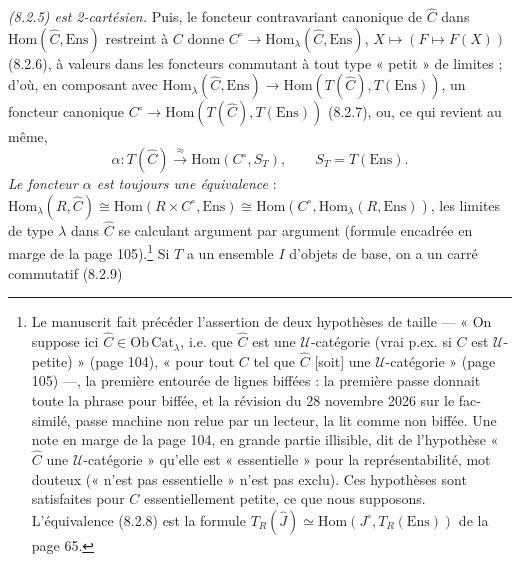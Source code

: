\documentclass[11pt,a4paper]{article}
\begin{document}
\emph{(8.2.5) est 2-cartésien.} Puis, le foncteur contravariant canonique de
$\widehat{C}$ dans $\mathrm{Hom}(\widehat{C}, \mathrm{Ens})$ restreint à $C$
donne $C^{\circ} \to \mathrm{Hom}_{\lambda}(\widehat{C}, \mathrm{Ens})$, $X
\mapsto (F \mapsto F(X))$ (8.2.6), à valeurs dans les foncteurs commutant à
tout type « petit » de limites ; d'où, en composant avec $\mathrm{Hom}_{
\lambda}(\widehat{C}, \mathrm{Ens}) \to \mathrm{Hom}(T(\widehat{C}),
T(\mathrm{Ens}))$, un foncteur canonique $C^{\circ} \to \mathrm{Hom}(T(\widehat{C}),
T(\mathrm{Ens}))$ (8.2.7), ou, ce qui revient au même,
\begin{equation}
\alpha : T(\widehat{C}) \xrightarrow{\ \approx\ } \mathrm{Hom}(C^{\circ}, S_{T}),
\qquad S_{T} = T(\mathrm{Ens}). \tag{8.2.8}
\end{equation}
\emph{Le foncteur $\alpha$ est toujours une équivalence} : $\mathrm{Hom}_{
\lambda}(R, \widehat{C}) \cong \mathrm{Hom}(R \times C^{\circ}, \mathrm{Ens})
\cong \mathrm{Hom}(C^{\circ}, \mathrm{Hom}_{\lambda}(R, \mathrm{Ens}))$, les
limites de type $\lambda$ dans $\widehat{C}$ se calculant argument par
argument (formule encadrée en marge de la page 105).\footnote{Le
manuscrit fait précéder l'assertion de deux hypothèses de taille — « On
suppose ici $\widehat{C} \in \mathrm{Ob}\,\mathrm{Cat}_{\lambda}$, i.e. que
$\widehat{C}$ est une $\mathcal{U}$-catégorie (vrai p.ex. si $C$ est
$\mathcal{U}$-petite) » (page 104), « pour tout $C$ tel que $\widehat{C}$
[soit] une $\mathcal{U}$-catégorie » (page 105) —, la première entourée de
lignes biffées : la première passe donnait toute la phrase pour biffée, et
la révision du 28 novembre 2026 sur le fac-similé, passe machine non relue par un lecteur, la lit comme non biffée. Une note en marge de la page 104, en grande
partie illisible, dit de l'hypothèse « $\widehat{C}$ une
$\mathcal{U}$-catégorie » qu'elle est « essentielle » pour la
représentabilité, mot douteux (« n'est pas essentielle » n'est pas exclu).
Ces hypothèses sont satisfaites pour $C$ essentiellement petite, ce que
nous supposons. L'équivalence (8.2.8) est
la formule $T_{R}(\widehat{J}) \simeq \mathrm{Hom}(J^{\circ}, T_{R}(\mathrm{Ens}))$
de la page 65.} Si $T$ a un ensemble $I$ d'objets de base, on a un carré
commutatif (8.2.9)

\end{document}
